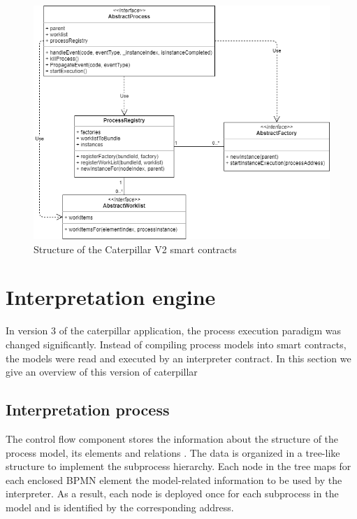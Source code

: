 \begin{figure}[hbt]
	\includegraphics[width=\textwidth]{gfx/caterpillar-compilation-contracts}
	\caption{Structure of the Caterpillar V2 smart contracts}
	\label{fig:caterpillar:v2:contracts}
\end{figure}

\section{Interpretation engine}
\label{sec:caterpillar:v3}

In version 3 of the caterpillar application, the process execution paradigm was changed significantly. Instead of compiling process models into smart contracts, the models were read and executed by an interpreter contract. In this section we give an overview of this version of caterpillar

\subsection{Interpretation process}
\label{sec:caterpillar:v3:process}

The control flow component stores the information about the structure of the process model, its elements and relations \cite{caterpillarv3}. The data is organized in a tree-like structure to implement the subprocess hierarchy. Each node in the tree maps for each enclosed BPMN element the model-related information to be used by the interpreter. As a result, each node is deployed once for each subprocess in the model and is identified by the corresponding address.

